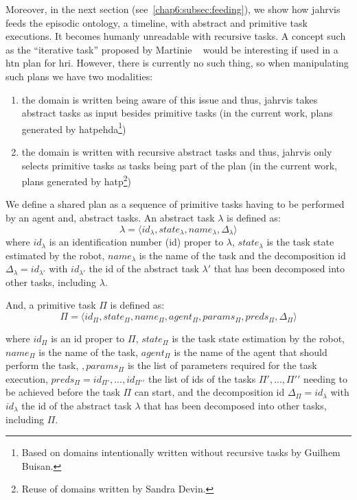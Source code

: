 \documentclass[a4paper,11pt,twoside]{StyleThese}
\begin{document}
Moreover, in the next section (see~\ref{chap6:subsec:feeding}), we show how \acrshort{jahrvis} feeds the episodic ontology, a timeline, with abstract and primitive task executions. It becomes humanly unreadable with recursive tasks. A concept such as the ``iterative task'' proposed by Martinie \etal{}~\cite{martinie_2011_structuring} would be interesting if used in a \acrshort{htn} plan for \acrshort{hri}. However, there is currently no such thing, so when manipulating such plans we have two modalities:
\begin{enumerate}
	\item the domain is written being aware of this issue and thus, \acrshort{jahrvis} takes abstract tasks as input besides primitive tasks (\ie in the current work, plans generated by \acrshort{hatpehda}\footnote{Based on domains intentionally written without recursive tasks by Guilhem Buisan.})
	\item the domain is written with recursive abstract tasks and thus, \acrshort{jahrvis} only selects primitive tasks as tasks being part of the plan (\ie in the current work, plans generated by \acrshort{hatp}\footnote{Reuse of domains written by Sandra Devin.})
\end{enumerate}

We define a shared plan as a sequence of primitive tasks having to be performed by an agent and, abstract tasks. An abstract task $\lambda$ is defined as: 
\[\lambda=\langle id_\lambda,state_\lambda,name_\lambda,\Delta_\lambda\rangle\] 
where $id_\lambda$ is an identification number (id) proper to $\lambda$, $state_\lambda$ is the task state estimated by the robot, $name_\lambda$ is the name of the task and the decomposition id $\Delta_\lambda=id_{\lambda\prime}$ with $id_{\lambda\prime}$ the id of the abstract task $\lambda\prime$ that has been decomposed into other tasks, including $\lambda$.

And, a primitive task $\Pi$ is defined as:
\[\Pi=\langle id_\Pi,state_\Pi,name_\Pi,agent_\Pi,params_\Pi,preds_\Pi,\Delta_\Pi\rangle\]

where $id_\Pi$ is an id proper to $\Pi$, $state_\Pi$ is the task state estimation by the robot, $name_\Pi$ is the name of the task, $agent_\Pi$ is the name of the agent that should perform the task, $,params_\Pi$ is the list of parameters required for the task execution, $preds_\Pi={id_{\Pi\prime},...,id_{\Pi\prime\prime}}$ the list of ids of the tasks $\Pi\prime,...,\Pi\prime\prime$ needing to be achieved before the task $\Pi$ can start, and the decomposition id $\Delta_\Pi=id_{\lambda}$ with $id_{\lambda}$ the id of the abstract task $\lambda$ that has been decomposed into other tasks, including $\Pi$.
\end{document}
